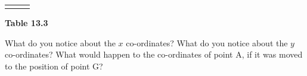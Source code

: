 {\begin{center}
\begin{xtabular*}{\mytablewidth}[t]{|p{10\mystarwidth}|p{10\mystarwidth}|p{10\mystarwidth}|}
    
         &
    
    
     \tabularnewline{}
    \end{xtabular*}
      \end{center}
    \begin{center}{\small\bfseries Table 13.3}\end{center}
    
    \addtocounter{footnote}{-0}
    
        }%
      
    \par
  
        
        \label{m39358*id70410}What do you notice about the $x$ co-ordinates? What do you notice about the \begin{math}y\end{math} co-ordinates?
What would happen to the co-ordinates of point A, if it was moved to the position of point G?
 \par 

